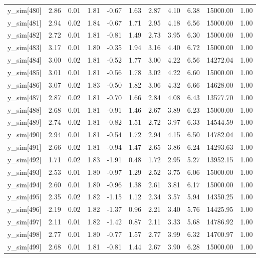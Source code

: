 \begin{table}[ht]
\begin{tabular}{rrrrrrrrrrr}
  y\_sim[480] & 2.86 & 0.01 & 1.81 & -0.67 & 1.63 & 2.87 & 4.10 & 6.38 & 15000.00 & 1.00 \\ 
  y\_sim[481] & 2.94 & 0.02 & 1.84 & -0.67 & 1.71 & 2.95 & 4.18 & 6.56 & 15000.00 & 1.00 \\ 
  y\_sim[482] & 2.72 & 0.01 & 1.81 & -0.81 & 1.49 & 2.73 & 3.95 & 6.30 & 15000.00 & 1.00 \\ 
  y\_sim[483] & 3.17 & 0.01 & 1.80 & -0.35 & 1.94 & 3.16 & 4.40 & 6.72 & 15000.00 & 1.00 \\ 
  y\_sim[484] & 3.00 & 0.02 & 1.81 & -0.52 & 1.77 & 3.00 & 4.22 & 6.56 & 14272.04 & 1.00 \\ 
  y\_sim[485] & 3.01 & 0.01 & 1.81 & -0.56 & 1.78 & 3.02 & 4.22 & 6.60 & 15000.00 & 1.00 \\ 
  y\_sim[486] & 3.07 & 0.02 & 1.83 & -0.50 & 1.82 & 3.06 & 4.32 & 6.66 & 14628.00 & 1.00 \\ 
  y\_sim[487] & 2.87 & 0.02 & 1.81 & -0.70 & 1.66 & 2.84 & 4.08 & 6.43 & 13577.70 & 1.00 \\ 
  y\_sim[488] & 2.68 & 0.01 & 1.81 & -0.91 & 1.46 & 2.67 & 3.89 & 6.23 & 15000.00 & 1.00 \\ 
  y\_sim[489] & 2.74 & 0.02 & 1.81 & -0.82 & 1.51 & 2.72 & 3.97 & 6.33 & 14544.59 & 1.00 \\ 
  y\_sim[490] & 2.94 & 0.01 & 1.81 & -0.54 & 1.72 & 2.94 & 4.15 & 6.50 & 14782.04 & 1.00 \\ 
  y\_sim[491] & 2.66 & 0.02 & 1.81 & -0.94 & 1.47 & 2.65 & 3.86 & 6.24 & 14293.63 & 1.00 \\ 
  y\_sim[492] & 1.71 & 0.02 & 1.83 & -1.91 & 0.48 & 1.72 & 2.95 & 5.27 & 13952.15 & 1.00 \\ 
  y\_sim[493] & 2.53 & 0.01 & 1.80 & -0.97 & 1.29 & 2.52 & 3.75 & 6.06 & 15000.00 & 1.00 \\ 
  y\_sim[494] & 2.60 & 0.01 & 1.80 & -0.96 & 1.38 & 2.61 & 3.81 & 6.17 & 15000.00 & 1.00 \\ 
  y\_sim[495] & 2.35 & 0.02 & 1.82 & -1.15 & 1.12 & 2.34 & 3.57 & 5.94 & 14350.25 & 1.00 \\ 
  y\_sim[496] & 2.19 & 0.02 & 1.82 & -1.37 & 0.96 & 2.21 & 3.40 & 5.76 & 14425.95 & 1.00 \\ 
  y\_sim[497] & 2.11 & 0.01 & 1.82 & -1.42 & 0.87 & 2.11 & 3.33 & 5.68 & 14786.92 & 1.00 \\ 
  y\_sim[498] & 2.77 & 0.01 & 1.80 & -0.77 & 1.57 & 2.77 & 3.99 & 6.32 & 14700.97 & 1.00 \\ 
  y\_sim[499] & 2.68 & 0.01 & 1.81 & -0.81 & 1.44 & 2.67 & 3.90 & 6.28 & 15000.00 & 1.00 \\ 

\end{tabular}
\end{table}
